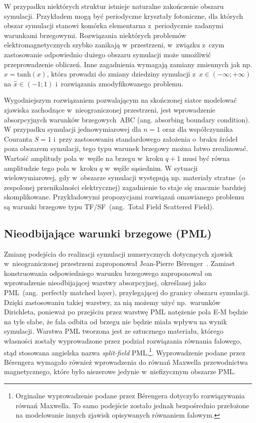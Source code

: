 W przypadku niektórych struktur istnieje naturalne zakończenie obszaru symulacji. Przykładem mogą być periodyczne kryształy fotoniczne, dla których obszar symulacji stanowi komórka elementarna z~periodycznie zadanymi warunkami brzegowymi. Rozwiązania niektórych problemów elektromagnetycznych szybko zanikają w~przestrzeni, w~związku z~czym zastosowanie odpowiednio dużego obszaru symulacji może umożliwić przeprowadzenie obliczeń. Inne zagadnienia wymagają zamiany zmiennych  jak np. $\hat{x}=\textrm{tanh}(x)$, która prowadzi do zmiany dziedziny symulacji z~$x\in(- \infty; + \infty)$ na $\hat{x}\in(-1;1)$ i~rozwiązania zmodyfikowanego problemu. 

Wygodniejszym rozwiązaniem pozwalającym na skończonej siatce modelować zjawiska zachodzące w~nieograniczonej przestrzeni, jest wprowadzenie absorpcyjnych warunków brzegowych~ABC (ang. absorbing boundary condition). W przypadku symulacji jednowymiarowej dla $n=1$ oraz dla współczynnika Couranta $S=1$ i~przy zastosowaniu standardowego założenia o~braku źródeł poza obszarem symulacji, tego typu warunek brzegowy można łatwo zrealizować. Wartość amplitudy pola w~węźle na brzegu w~kroku $q+1$ musi być równa amplitudzie tego pola w~kroku $q$ w~węźle sąsiednim. W sytuacji wielowymiarowej, gdy w~obszarze symulacji występują np. materiały stratne~(o zespolonej przenikalności elektrycznej) zagadnienie to staje się znacznie bardziej skomplikowane. Przykładowymi propozycjami rozwiązań omawianego problemu są warunki brzegowe typu TF/SF~(ang.~Total Field Scattered Field).

\subsection{Nieodbijające warunki brzegowe (PML)}
\label{art:pml}
Zmianę podejścia do realizacji symulacji numerycznych dotyczących zjawisk w~nieograniczonej przestrzeni zaproponował Jean-Pierre B\'{e}renger~\cite{1994JCoPh.114..185B}. Zamiast konstruowania odpowiedniego warunku brzegowego zaproponował on wprowadzenie nieodbijającej warstwy absorpcyjnej, określanej jako PML~(ang.~perfectly matched layer), przylegającej do granicy obszaru symulacji. Dzięki zastosowaniu takiej warstwy, za nią możemy użyć np.~warunków Dirichleta, ponieważ po przejściu przez warstwę PML natężenie pola E-M będzie na tyle słabe, że fala odbita od brzegu nie będzie miała wpływu na wynik symulacji. Warstwa PML tworzona jest ze sztucznego materiału, którego własności zostały wyprowadzone przez podział rozwiązania równania falowego,  stąd stosowana angielska nazwa {\it split-field} PML.\footnote{Orginalne wyprowadzenie podane przez B\'{e}rengera dotyczyło rozwiązywania równań Maxwella. To samo podejście zostało jednak bezpośrednio przełożone na modelowanie innych zjawisk opisywanych równaniem falowym.}.  Wyprowadzenie podane przez B\'{e}rengera  wymagało również wprowadzenia do równań Maxwella przewodnictwa magnetycznego, które było niezerowe jedynie w~niefizycznym obszarze PML.


